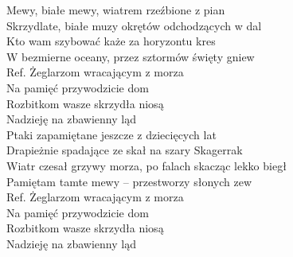 
\begin{flushleft}
Mewy, białe mewy, wiatrem rzeźbione z pian  \tab{}\\
Skrzydlate, białe muzy okrętów odchodzących w dal \\
Kto wam szybować każe za horyzontu kres \tab{}\\
W bezmierne oceany, przez sztormów święty gniew \\
\vskip 3mm
Ref. Żeglarzom wracającym z morza \tab{}\\
\hspace{0.9cm}Na pamięć przywodzicie dom \tab{}\\
\hspace{0.9cm}Rozbitkom wasze skrzydła niosą \tab{} \\
\hspace{0.9cm}Nadzieję na zbawienny ląd \tab{}\\
\vskip 3mm
Ptaki zapamiętane jeszcze z dziecięcych lat \\
Drapieżnie spadające ze skał na szary Skagerrak \\
Wiatr czesał grzywy morza, po falach skacząc lekko biegł \\
Pamiętam tamte mewy – przestworzy słonych zew \\
\vskip 3mm
Ref. Żeglarzom wracającym z morza\\
\hspace{0.9cm}Na pamięć przywodzicie dom \\
\hspace{0.9cm}Rozbitkom wasze skrzydła niosą \\
\hspace{0.9cm}Nadzieję na zbawienny ląd \\
\end{flushleft}
\clearpage
